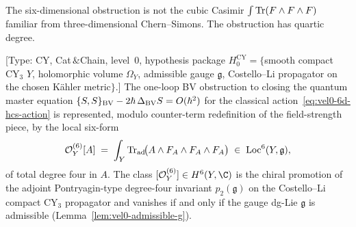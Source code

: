 The six-dimensional obstruction is not the cubic Casimir
$\int \operatorname{Tr}(F \wedge F \wedge F)$ familiar from three-dimensional
Chern--Simons. The obstruction has quartic degree.

\begin{theorem}
\label{thm:vel0-quartic-anomaly}
\textup{[Type: CY, Cat$\,\&$Chain, level~$0$, hypothesis package
$H_0^{\mathrm{CY}} = \{$smooth compact CY$_3$ $Y$, holomorphic volume
$\Omega_Y$, admissible gauge $\mathfrak{g}$, Costello--Li propagator
on the chosen K\"ahler metric$\}$.]}
The one-loop BV obstruction to closing the quantum master equation
$\{S, S\}_{\mathrm{BV}} - 2 \hbar\, \Delta_{\mathrm{BV}} S = O(\hbar^2)$ for the
classical action~\eqref{eq:vel0-6d-hcs-action} is represented, modulo
counter-term redefinition of the field-strength piece, by the local
six-form
\begin{equation}
\label{eq:vel0-quartic-form}
\mathcal O^{(6)}_Y[A]
\;=\;
\int_Y \operatorname{Tr}_{\mathrm{ad}}\!\bigl(A \wedge F_A \wedge F_A \wedge F_A\bigr)
\;\in\; \mathrm{Loc}^{6}(Y, \mathfrak{g}),
\end{equation}
of total degree four in $A$. The class
$[\mathcal O^{(6)}_Y] \in H^6(Y, \C)$ is the chiral promotion of the
adjoint Pontryagin-type degree-four invariant $p_2(\mathfrak{g})$ on
the Costello--Li compact CY$_3$ propagator and vanishes if and only if
the gauge dg-Lie $\mathfrak{g}$ is admissible
\textup{(}Lemma~\ref{lem:vel0-admissible-g}\textup{).}
\end{theorem}

